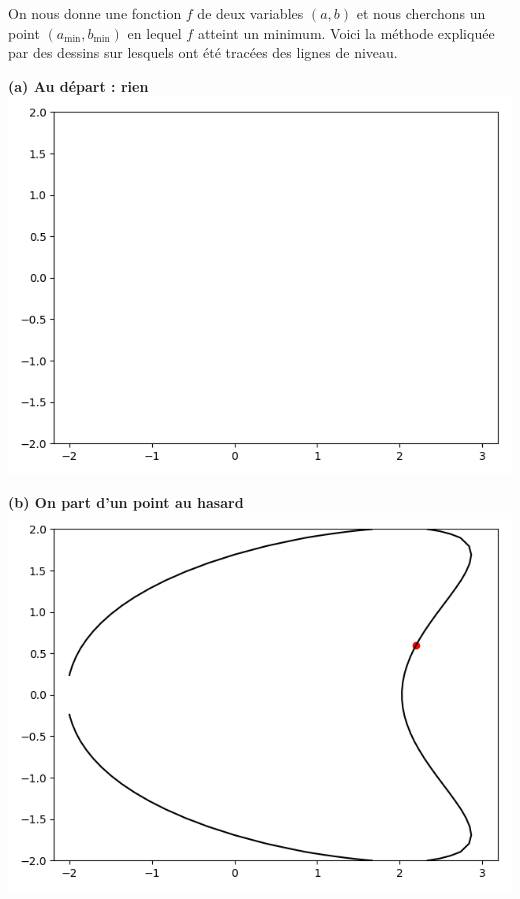 On nous donne une fonction $f$ de deux variables $(a,b)$ et nous cherchons un point
$(a_{\min},b_{\min})$ en lequel $f$ atteint un minimum.
Voici la méthode expliquée par des dessins sur lesquels ont été tracées des lignes de niveau.

\begin{center}
	\begin{minipage}{0.48\textwidth}
		\begin{center}
			{\bf (a) Au départ : rien}
			\includegraphics[scale=\myscale,scale=0.5]{figures/descente_intro_01}
		\end{center}
	\end{minipage}
	\begin{minipage}{0.48\textwidth}
		\begin{center}
			{\bf (b) On part d'un point au hasard}
			\includegraphics[scale=\myscale,scale=0.5]{figures/descente_intro_02}
		\end{center}
	\end{minipage}
\end{center}

